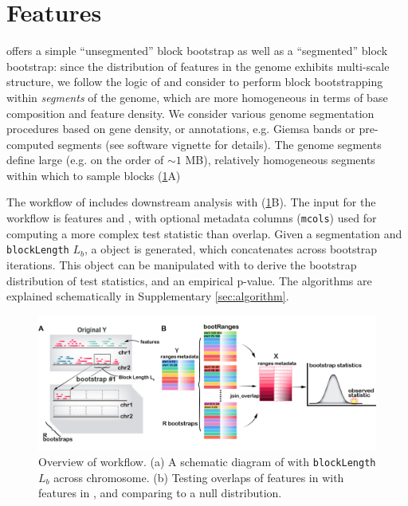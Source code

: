 \vspace*{-20pt}

\section{Features}
\bootranges offers a simple ``unsegmented'' block bootstrap as well as
a ``segmented'' block bootstrap:
since the distribution of features in the genome exhibits multi-scale
structure, we follow the logic of \citet{bickel2010subsampling} and consider to
perform block bootstrapping within \textit{segments} of the genome, which are
more homogeneous in terms of base composition and feature density.
We consider various genome segmentation procedures based on gene
density, or annotations, e.g. Giemsa bands or pre-computed segments
(see software vignette for details).
The genome segments define large (e.g. on the order of ${\sim}1$ MB),
relatively homogeneous segments within which to sample blocks (\cref{fig:framework}A)

The workflow of \bootranges includes downstream analysis with
\plyranges (\cref{fig:framework}B).
The input for the workflow is \granges features  and
, with optional metadata columns (\texttt{mcols}) used for
computing a more complex test statistic than overlap.
Given a segmentation and \texttt{blockLength} $L_b$, a \bootranges
object is generated, which concatenates \granges across bootstrap
iterations. This \bootranges object can be manipulated with \plyranges
to derive the bootstrap distribution of test statistics, and an
empirical p-value.
The \bootranges algorithms are explained schematically in Supplementary \cref{sec:algorithm}.

\vspace{-0.3cm}
\begin{figure}[htbp]
\centering%
\setlength{\abovecaptionskip}{-0.05cm}
\includegraphics[scale=0.65]{Figures/bootRanges.jpg}
\caption{Overview of \bootranges workflow. (a) A schematic
  diagram of \bootranges with \texttt{blockLength} $L_b$ across chromosome.
  (b) Testing overlaps of features in  with features in
  , and comparing to a null distribution.} 
\label{fig:framework}
\vspace{-0.5cm}
\end{figure}

